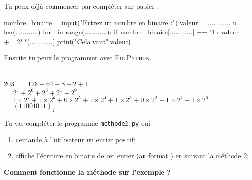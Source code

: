 \documentclass[a4paper,12pt,french]{book}
\begin{document}
Tu peux déjà commencer par compléter sur papier :
\newpage

\begin{pythoncode}
nombre_binaire = input("Entrez un nombre en binaire :")
valeur = ............
n = len(............)
for i in range(............):
    if nombre_binaire[............] == '1':
        valeur += 2**(............)
print("Cela vaut",valeur)
\end{pythoncode}

Ensuite tu peux le programmer avec \textsc{EduPython}.\\

\exo{}\\
\begin{methode}
\begin{tabbing}
	203	\= 	$=128+64+8+2+1$	\\
	
		\>	$=2^7+2^6+2^3+2^1+2^0$	\\
		
		\>	$=1\times 2^7+1\times 2^6+0\times 2^5 + 0\times 2^4 +1\times 2^3+0\times 2^2 + 1\times 
		2^1+1\times 2^0$	\\
		
		\> $=(11001011)_2$
\end{tabbing}
\end{methode}

Tu vas compléter le programme \texttt{methode2.py} qui
\begin{enumerate}[--]
	\item 	demande à l'utilisateur un entier positif;
	\item 	affiche l'écriture en binaire de cet entier (au format ) en suivant la méthode 2;\\
\end{enumerate}

\textbf{Comment fonctionne la méthode sur l'exemple ?}\\
\end{document}
